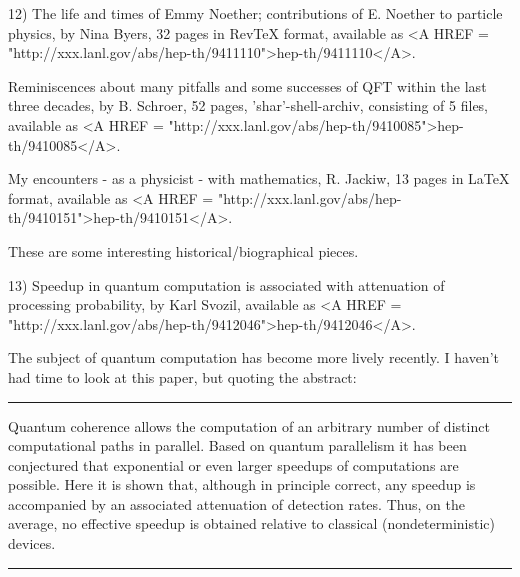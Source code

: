 12) The life and times of Emmy Noether; contributions of E. Noether to
particle physics, by Nina Byers, 32 pages in RevTeX format, available as
<A HREF = "http://xxx.lanl.gov/abs/hep-th/9411110">hep-th/9411110</A>.

Reminiscences about many pitfalls and some successes of QFT within the last
three decades, by B. Schroer, 52 pages, 'shar'-shell-archiv, consisting of 5
files, available as <A HREF = "http://xxx.lanl.gov/abs/hep-th/9410085">hep-th/9410085</A>.  

My encounters - as a physicist - with mathematics, R. Jackiw, 13
pages in LaTeX format, available as <A HREF = "http://xxx.lanl.gov/abs/hep-th/9410151">hep-th/9410151</A>. 


These are some interesting historical/biographical pieces.


13) Speedup in quantum computation is associated with attenuation of
processing probability, by Karl Svozil, available as <A HREF = "http://xxx.lanl.gov/abs/hep-th/9412046">hep-th/9412046</A>.

The subject of quantum computation has become more lively recently.
I haven't had time to look at this paper, but quoting the abstract:

\par\noindent\rule{\textwidth}{0.4pt}
Quantum coherence allows the computation of an arbitrary number of
distinct computational paths in parallel. Based on quantum parallelism
it has been conjectured that exponential or even larger speedups of
computations are possible. Here it is shown that, although in principle
correct, any speedup is accompanied by an associated attenuation of
detection rates. Thus, on the average, no effective speedup is obtained
relative to classical (nondeterministic) devices.
\par\noindent\rule{\textwidth}{0.4pt}
